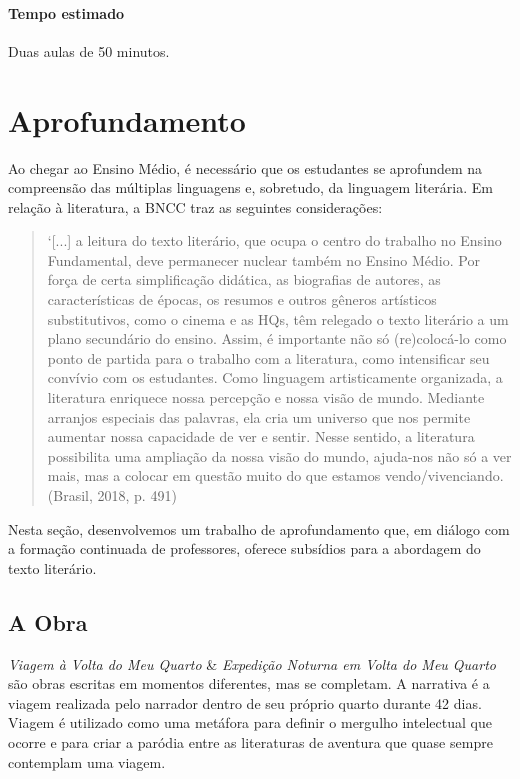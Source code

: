 \documentclass[12pt]{extarticle}
\begin{document}
\paragraph{Tempo estimado} Duas aulas de 50 minutos.


\section{Aprofundamento}

Ao chegar ao Ensino Médio, é necessário que os estudantes se aprofundem
na compreensão das múltiplas linguagens e, sobretudo, da linguagem
literária. Em relação à literatura, a BNCC traz as seguintes
considerações:

\begin{quote}
`{[}...{]} a leitura do texto literário, que ocupa o centro do trabalho
no Ensino Fundamental, deve permanecer nuclear também no Ensino Médio.
Por força de certa simplificação didática, as biografias de autores, as
características de épocas, os resumos e outros gêneros artísticos
substitutivos, como o cinema e as HQs, têm relegado o texto literário a
um plano secundário do ensino. Assim, é importante não só (re)colocá-lo
como ponto de partida para o trabalho com a literatura, como
intensificar seu convívio com os estudantes. Como linguagem
artisticamente organizada, a literatura enriquece nossa percepção e
nossa visão de mundo. Mediante arranjos especiais das palavras, ela cria
um universo que nos permite aumentar nossa capacidade de ver e sentir.
Nesse sentido, a literatura possibilita uma ampliação da nossa visão do
mundo, ajuda-nos não só a ver mais, mas a colocar em questão muito do
que estamos vendo/vivenciando. (Brasil, 2018, p. 491)
\end{quote}

Nesta seção, desenvolvemos um trabalho de aprofundamento que, em diálogo
com a formação continuada de professores, oferece subsídios para a
abordagem do texto literário.

\subsection{A Obra}




\emph{Viagem à Volta do Meu Quarto} \& \emph{Expedição Noturna em Volta
do Meu Quarto} são obras escritas em momentos diferentes, mas se
completam. A narrativa é a viagem realizada pelo narrador dentro de seu
próprio quarto durante 42 dias. Viagem é utilizado como uma metáfora
para definir o mergulho intelectual que ocorre e para criar a paródia
entre as literaturas de aventura que quase sempre contemplam uma viagem.
\end{document}
